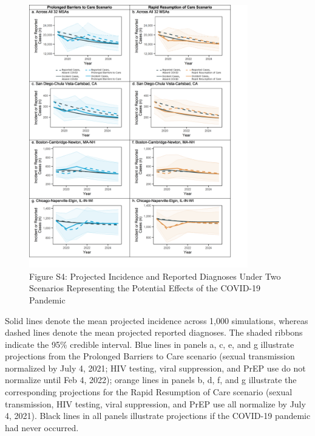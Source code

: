 \documentclass{article}
\begin{document}
\begin{figure}[H]
	\caption{Figure S4: Projected Incidence and Reported Diagnoses Under Two Scenarios Representing the Potential Effects of the COVID-19 Pandemic}
	\includegraphics[width=0.85\textwidth]{images/figure_s4}
\end{figure}
Solid lines denote the mean projected incidence across 1,000 simulations, whereas dashed lines denote the mean projected reported diagnoses. The shaded ribbons indicate the 95\% credible interval. Blue lines in panels a, c, e, and g illustrate projections from the Prolonged Barriers to Care scenario (sexual transmission normalized by July 4, 2021; HIV testing, viral suppression, and PrEP use do not normalize until Feb 4, 2022); orange lines in panels b, d, f, and g illustrate the corresponding projections for the Rapid Resumption of Care scenario (sexual transmission, HIV testing, viral suppression, and PrEP use all normalize by July 4, 2021). Black lines in all panels illustrate projections if the COVID-19 pandemic had never occurred.
\end{document}
